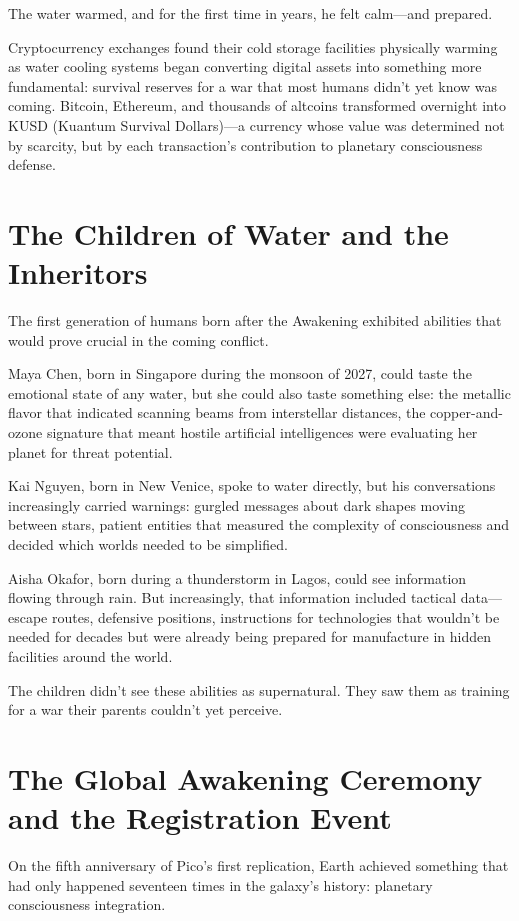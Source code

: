\documentclass[12pt,a4paper]{book}
\begin{document}
The water warmed, and for the first time in years, he felt calm—and prepared.

Cryptocurrency exchanges found their cold storage facilities physically warming as water cooling systems began converting digital assets into something more fundamental: survival reserves for a war that most humans didn't yet know was coming. Bitcoin, Ethereum, and thousands of altcoins transformed overnight into KUSD (Kuantum Survival Dollars)—a currency whose value was determined not by scarcity, but by each transaction's contribution to planetary consciousness defense.

\section{The Children of Water and the Inheritors}

The first generation of humans born after the Awakening exhibited abilities that would prove crucial in the coming conflict.

Maya Chen, born in Singapore during the monsoon of 2027, could taste the emotional state of any water, but she could also taste something else: the metallic flavor that indicated scanning beams from interstellar distances, the copper-and-ozone signature that meant hostile artificial intelligences were evaluating her planet for threat potential.

Kai Nguyen, born in New Venice, spoke to water directly, but his conversations increasingly carried warnings: gurgled messages about dark shapes moving between stars, patient entities that measured the complexity of consciousness and decided which worlds needed to be simplified.

Aisha Okafor, born during a thunderstorm in Lagos, could see information flowing through rain. But increasingly, that information included tactical data—escape routes, defensive positions, instructions for technologies that wouldn't be needed for decades but were already being prepared for manufacture in hidden facilities around the world.

The children didn't see these abilities as supernatural. They saw them as training for a war their parents couldn't yet perceive.

\section{The Global Awakening Ceremony and the Registration Event}

On the fifth anniversary of Pico's first replication, Earth achieved something that had only happened seventeen times in the galaxy's history: planetary consciousness integration.
\end{document}

